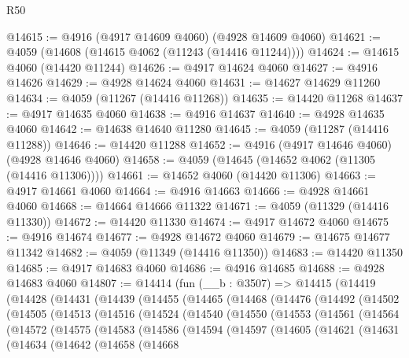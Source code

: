 \begin{lexlean}{R50}
\begin{coremodule}
@14615 := @4916 (@4917 @14609 @4060) (@4928 @14609 @4060)
@14621 := @4059 (@14608 (@14615 @4062 (@11243 (@14416 @11244))))
@14624 := @14615 @4060 (@14420 @11244)
@14626 := @4917 @14624 @4060
@14627 := @4916 @14626
@14629 := @4928 @14624 @4060
@14631 := @14627 @14629 @11260
@14634 := @4059 (@11267 (@14416 @11268))
@14635 := @14420 @11268
@14637 := @4917 @14635 @4060
@14638 := @4916 @14637
@14640 := @4928 @14635 @4060
@14642 := @14638 @14640 @11280
@14645 := @4059 (@11287 (@14416 @11288))
@14646 := @14420 @11288
@14652 := @4916 (@4917 @14646 @4060) (@4928 @14646 @4060)
@14658 := @4059 (@14645 (@14652 @4062 (@11305 (@14416 @11306))))
@14661 := @14652 @4060 (@14420 @11306)
@14663 := @4917 @14661 @4060
@14664 := @4916 @14663
@14666 := @4928 @14661 @4060
@14668 := @14664 @14666 @11322
@14671 := @4059 (@11329 (@14416 @11330))
@14672 := @14420 @11330
@14674 := @4917 @14672 @4060
@14675 := @4916 @14674
@14677 := @4928 @14672 @4060
@14679 := @14675 @14677 @11342
@14682 := @4059 (@11349 (@14416 @11350))
@14683 := @14420 @11350
@14685 := @4917 @14683 @4060
@14686 := @4916 @14685
@14688 := @4928 @14683 @4060
@14807 := @14414
    (fun (__b : @3507) =>
    @14415
      (@14419
        (@14428
          (@14431
            (@14439
              (@14455
                (@14465
                  (@14468
                    (@14476
                      (@14492
                        (@14502
                          (@14505
                            (@14513
                              (@14516
                                (@14524
                                  (@14540
                                    (@14550
                                      (@14553
                                        (@14561
                                          (@14564
                                            (@14572
                                              (@14575
                                                (@14583
                                                  (@14586
                                                    (@14594
                                                      (@14597
                                                        (@14605
                                                          (@14621
                                                            (@14631
                                                              (@14634
                                                                (@14642
                                                                  (@14658
                                                                    (@14668

\end{coremodule}
\end{lexlean}
